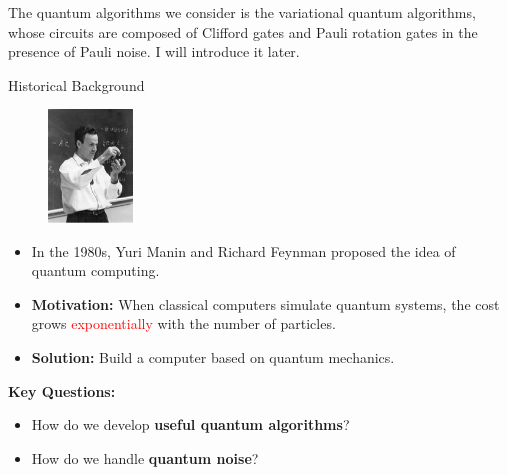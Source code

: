\documentclass[10pt]{beamer}
\begin{document}
\begin{CJK}{UTF8}{gbsn}
{  The quantum algorithms we consider is the variational quantum algorithms, whose circuits are composed of Clifford gates and Pauli rotation gates in the presence of Pauli noise.
  I will introduce it later.
}


\begin{frame}[fragile]{Historical Background}
  \begin{figure}
    \centering
    \includegraphics[width=0.2\textwidth]{fig/feynman.png}
  \end{figure}
  \begin{itemize}%
    \item In the 1980s, Yuri Manin and Richard Feynman proposed the idea of quantum computing.
    \item \textbf{Motivation:} When classical computers simulate quantum systems, the cost grows \textcolor{red}{exponentially} with the number of particles. 
    \item \textbf{Solution:} Build a computer based on quantum mechanics.
  \end{itemize}
  \textbf{Key Questions:}
  \begin{itemize}
    \item How do we develop \textbf{useful quantum algorithms}?
    \item How do we handle \textbf{quantum noise}?
  \end{itemize}
\end{frame}
\end{CJK}
\end{document}
